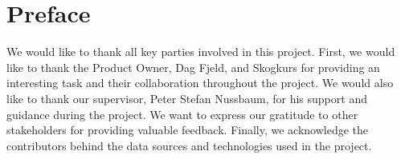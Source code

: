 \chapter*{Preface}

We would like to thank all key parties involved in this project. First, we would like to thank the Product Owner, Dag Fjeld, and Skogkurs for providing an interesting task and their collaboration throughout the project. We would also like to thank our supervisor, Peter Stefan Nussbaum, for his support and guidance during the project. We want to express our gratitude to other stakeholders for providing valuable feedback. Finally, we acknowledge the contributors behind the data sources and technologies used in the project.
